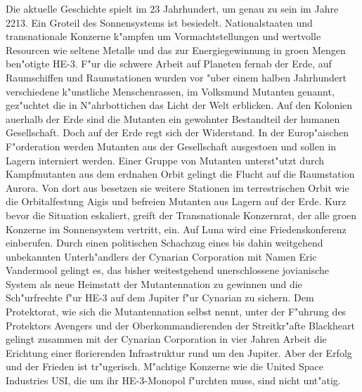 \newchapter{\@introchaptername}

Die aktuelle Geschichte spielt im 23 Jahrhundert, um genau zu sein im Jahre 2213. Ein Gro\3teil des Sonnensystems ist besiedelt. Nationalstaaten und transnationale Konzerne k"ampfen um Vormachtstellungen und wertvolle Resourcen wie seltene Metalle und das zur Energiegewinnung in gro\3en Mengen ben"otigte HE-3. F"ur die schwere Arbeit auf Planeten fernab der Erde, auf Raumschiffen und Raumstationen wurden vor "uber einem halben Jahrhundert verschiedene k"unstliche Menschenrassen, im Volksmund Mutanten genannt, gez"uchtet die in N"ahrbottichen das Licht der Welt erblicken. Auf den Kolonien au\3erhalb der Erde sind die Mutanten ein gewohnter Bestandteil der humanen Gesellschaft. Doch auf der Erde regt sich der Widerstand. In der Europ"aischen F"orderation werden Mutanten aus der Gesellschaft ausgesto\3en und sollen in Lagern interniert werden. Einer Gruppe von Mutanten unterst"utzt durch Kampfmutanten aus dem erdnahen Orbit gelingt die Flucht auf die Raumstation Aurora. Von dort aus besetzen sie weitere Stationen im terrestrischen Orbit wie die Orbitalfestung Aigis und befreien Mutanten aus Lagern auf der Erde. Kurz bevor die Situation eskaliert, greift der Transnationale Konzernrat, der alle gro\3en Konzerne im Sonnensystem vertritt, ein. Auf Luna wird eine Friedenskonferenz einberufen. Durch einen politischen Schachzug eines bis dahin weitgehend unbekannten Unterh"andlers der Cynarian Corporation mit Namen Eric Vandermool gelingt es, das bisher weitestgehend unerschlossene jovianische System als neue Heimstatt der Mutantennation zu gewinnen und die Sch"urfrechte f"ur HE-3 auf dem Jupiter f"ur Cynarian zu sichern. Dem Protektorat, wie sich die Mutantennation selbst nennt, unter der F"uhrung des Protektors Avengers und der Oberkommandierenden der Streitkr"afte Blackheart gelingt zusammen mit der Cynarian Corporation in vier Jahren Arbeit die Erichtung einer florierenden Infrastruktur rund um den Jupiter. Aber der Erfolg und der Frieden ist tr"ugerisch. M"achtige Konzerne wie die United Space Industries USI, die um ihr HE-3-Monopol f"urchten muss, sind nicht unt"atig.